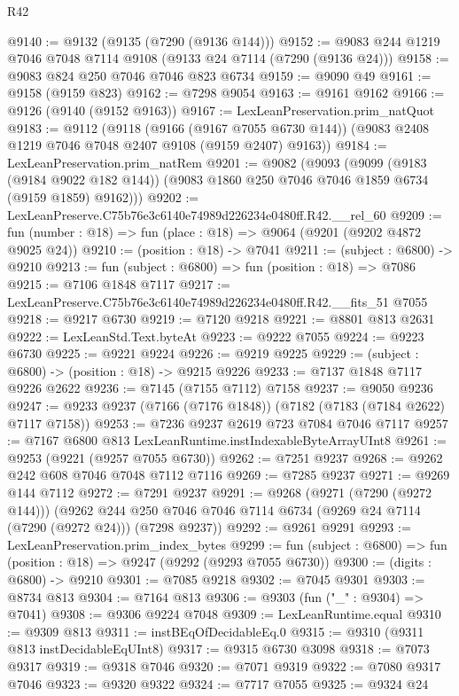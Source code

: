 \begin{lexlean}{R42}
\begin{coremodule}
{@9140 := @9132 (@9135 (@7290 (@9136 @144)))
@9152 := @9083 @244 @1219 @7046 @7048 @7114 @9108 (@9133 @24 @7114 (@7290 (@9136 @24)))
@9158 := @9083 @824 @250 @7046 @7046 @823 @6734
@9159 := @9090 @49
@9161 := @9158 (@9159 @823)
@9162 := @7298 @9054
@9163 := @9161 @9162
@9166 := @9126 (@9140 (@9152 @9163))
@9167 := LexLeanPreservation.prim_natQuot
@9183 := @9112
    (@9118
      (@9166 (@9167 @7055 @6730 @144))
      (@9083 @2408 @1219 @7046 @7048 @2407 @9108 (@9159 @2407) @9163))
@9184 := LexLeanPreservation.prim_natRem
@9201 := @9082
    (@9093
      (@9099
        (@9183 (@9184 @9022 @182 @144))
        (@9083 @1860 @250 @7046 @7046 @1859 @6734 (@9159 @1859) @9162)))
@9202 := LexLeanPreserve.C75b76e3c6140e74989d226234e0480ff.R42.__rel_60
@9209 := fun (number : @18) => fun (place : @18) => @9064 (@9201 (@9202 @4872 @9025 @24))
@9210 := (position : @18) -> @7041
@9211 := (subject : @6800) -> @9210
@9213 := fun (subject : @6800) => fun (position : @18) => @7086
@9215 := @7106 @1848 @7117
@9217 := LexLeanPreserve.C75b76e3c6140e74989d226234e0480ff.R42.__fits_51 @7055
@9218 := @9217 @6730
@9219 := @7120 @9218
@9221 := @8801 @813 @2631
@9222 := LexLeanStd.Text.byteAt
@9223 := @9222 @7055
@9224 := @9223 @6730
@9225 := @9221 @9224
@9226 := @9219 @9225
@9229 := (subject : @6800) -> (position : @18) -> @9215 @9226
@9233 := @7137 @1848 @7117 @9226 @2622
@9236 := @7145 (@7155 @7112) @7158
@9237 := @9050 @9236
@9247 := @9233 @9237 (@7166 (@7176 @1848)) (@7182 (@7183 (@7184 @2622) @7117 @7158))
@9253 := @7236 @9237 @2619 @723 @7084 @7046 @7117
@9257 := @7167 @6800 @813 LexLeanRuntime.instIndexableByteArrayUInt8
@9261 := @9253 (@9221 (@9257 @7055 @6730))
@9262 := @7251 @9237
@9268 := @9262 @242 @608 @7046 @7048 @7112 @7116
@9269 := @7285 @9237
@9271 := @9269 @144 @7112
@9272 := @7291 @9237
@9291 := @9268
    (@9271 (@7290 (@9272 @144)))
    (@9262 @244 @250 @7046 @7046 @7114 @6734 (@9269 @24 @7114 (@7290 (@9272 @24))) (@7298 @9237))
@9292 := @9261 @9291
@9293 := LexLeanPreservation.prim_index_bytes
@9299 := fun (subject : @6800) => fun (position : @18) => @9247 (@9292 (@9293 @7055 @6730))
@9300 := (digits : @6800) -> @9210
@9301 := @7085 @9218
@9302 := @7045 @9301
@9303 := @8734 @813
@9304 := @7164 @813
@9306 := @9303 (fun ("_" : @9304) => @7041)
@9308 := @9306 @9224 @7048
@9309 := LexLeanRuntime.equal
@9310 := @9309 @813
@9311 := instBEqOfDecidableEq.{0}
@9315 := @9310 (@9311 @813 instDecidableEqUInt8)
@9317 := @9315 @6730 @3098
@9318 := @7073 @9317
@9319 := @9318 @7046
@9320 := @7071 @9319
@9322 := @7080 @9317 @7046
@9323 := @9320 @9322
@9324 := @7717 @7055
@9325 := @9324 @24
}
\end{coremodule}
\end{lexlean}
